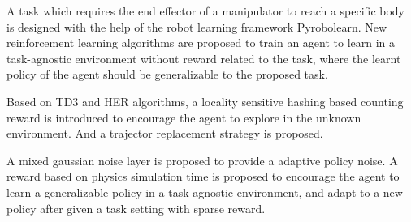 \begin{eabstract}
A task which requires the end effector of a manipulator to reach a specific body is designed with the help of the robot learning framework Pyrobolearn. New reinforcement learning algorithms are proposed to train an agent to learn in a task-agnostic environment without reward related to the task, where the learnt policy of the agent should be generalizable to the proposed task.

Based on TD3 and HER algorithms, a locality sensitive hashing based counting reward is introduced to encourage the agent to explore in the unknown environment. And a trajector replacement strategy is proposed.

    A mixed gaussian noise layer is proposed to provide a adaptive policy noise. A reward based on physics simulation time is proposed to encourage the agent to learn a generalizable policy in a task agnostic environment, and adapt to a new policy after given a task setting with sparse reward.
\end{eabstract}
